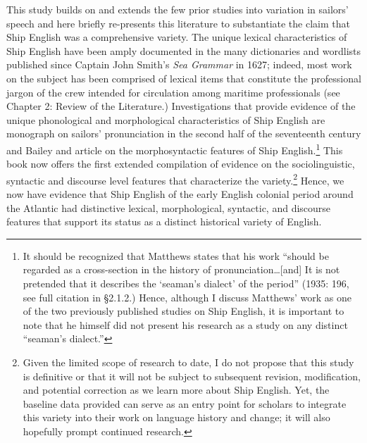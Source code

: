  This study builds on and extends the few prior studies into variation in sailors’ speech and here briefly re-presents this literature to substantiate the claim that Ship English was a comprehensive variety. The unique lexical characteristics of Ship English have been amply documented in the many dictionaries and wordlists published since Captain John Smith’s \textit{Sea Grammar} in 1627; indeed, most work on the subject has been comprised of lexical items that constitute the professional jargon of the crew intended for circulation among maritime professionals (see Chapter 2: Review of the Literature.) Investigations that provide evidence of the unique phonological and morphological characteristics of Ship English are  monograph on sailors’ pronunciation in the second half of the seventeenth century and Bailey and  article on the morphosyntactic features of Ship English.\footnote{It should be recognized that Matthews states that his work “should be regarded as a cross-section in the history of pronunciation…[and] It is not pretended that it describes the ‘seaman’s dialect’ of the period” (1935: 196, see full citation in §2.1.2.) Hence, although I discuss Matthews’ work as one of the two previously published studies on Ship English, it is important to note that he himself did not present his research as a study on any distinct “seaman’s dialect.”}  This book now offers the first extended compilation of evidence on the sociolinguistic, syntactic and discourse level features that characterize the variety.\footnote{Given the limited scope of research to date, I do not propose that this study is definitive or that it will not be subject to subsequent revision, modification, and potential correction as we learn more about Ship English. Yet, the baseline data provided can serve as an entry point for scholars to integrate this variety into their work on language history and change; it will also hopefully prompt continued research.}  Hence, we now have evidence that Ship English of the early English colonial period around the Atlantic had distinctive lexical, morphological, syntactic, and discourse features that support its status as a distinct historical variety of English. 

